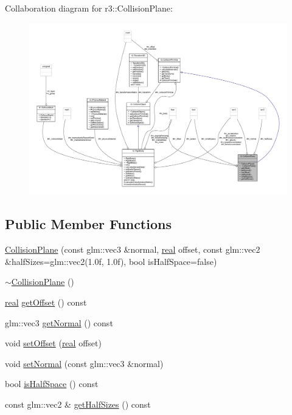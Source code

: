 Collaboration diagram for r3\+:\+:Collision\+Plane\+:\nopagebreak
\begin{figure}[H]
\begin{center}
\leavevmode
\includegraphics[width=350pt]{classr3_1_1_collision_plane__coll__graph}
\end{center}
\end{figure}
\subsection*{Public Member Functions}
\begin{DoxyCompactItemize}
\item 
\mbox{\hyperlink{classr3_1_1_collision_plane_ae3f8642b62667018e4a4c3120880fd0f}{Collision\+Plane}} (const glm\+::vec3 \&normal, \mbox{\hyperlink{namespacer3_ab2016b3e3f743fb735afce242f0dc1eb}{real}} offset, const glm\+::vec2 \&half\+Sizes=glm\+::vec2(1.\+0f, 1.\+0f), bool is\+Half\+Space=false)
\item 
\mbox{\hyperlink{classr3_1_1_collision_plane_a4c83b51c544a5fda9d949baced5cea02}{$\sim$\+Collision\+Plane}} ()
\item 
\mbox{\hyperlink{namespacer3_ab2016b3e3f743fb735afce242f0dc1eb}{real}} \mbox{\hyperlink{classr3_1_1_collision_plane_a62e2b4bd6a811f8d2541329cd9a49bf8}{get\+Offset}} () const
\item 
glm\+::vec3 \mbox{\hyperlink{classr3_1_1_collision_plane_aa6605acf447da4e45084e6d25c1067ad}{get\+Normal}} () const
\item 
void \mbox{\hyperlink{classr3_1_1_collision_plane_ae37e09e6b807cdd800671daa5623b073}{set\+Offset}} (\mbox{\hyperlink{namespacer3_ab2016b3e3f743fb735afce242f0dc1eb}{real}} offset)
\item 
void \mbox{\hyperlink{classr3_1_1_collision_plane_a1fa140b6648f14bef9720ac0d4eefc99}{set\+Normal}} (const glm\+::vec3 \&normal)
\item 
bool \mbox{\hyperlink{classr3_1_1_collision_plane_a87f5071d181b4c643b42cb2448464be2}{is\+Half\+Space}} () const
\item 
const glm\+::vec2 \& \mbox{\hyperlink{classr3_1_1_collision_plane_ab48030fbf5bc17cd5ad81e5eb654a4b4}{get\+Half\+Sizes}} () const
\end{DoxyCompactItemize}
